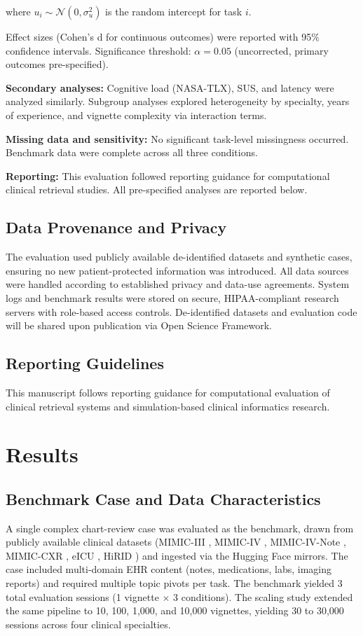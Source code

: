 \documentclass[preprint,12pt]{elsarticle}
\begin{document}
where $u_i \sim \mathcal{N}(0, \sigma_u^2)$ is the random intercept for task $i$.

Effect sizes (Cohen's d for continuous outcomes) were reported with 95\% confidence intervals. Significance threshold: $\alpha = 0.05$ (uncorrected, primary outcomes pre-specified).

\textbf{Secondary analyses:} Cognitive load (NASA-TLX), SUS, and latency were analyzed similarly. Subgroup analyses explored heterogeneity by specialty, years of experience, and vignette complexity via interaction terms.

\textbf{Missing data and sensitivity:} No significant task-level missingness occurred. Benchmark data were complete across all three conditions.

\textbf{Reporting:} This evaluation followed reporting guidance for computational clinical retrieval studies. All pre-specified analyses are reported below.

\subsection{Data Provenance and Privacy}
The evaluation used publicly available de-identified datasets and synthetic cases, ensuring no new patient-protected information was introduced. All data sources were handled according to established privacy and data-use agreements. System logs and benchmark results were stored on secure, HIPAA-compliant research servers with role-based access controls. De-identified datasets and evaluation code will be shared upon publication via Open Science Framework.

\subsection{Reporting Guidelines}
This manuscript follows reporting guidance for computational evaluation of clinical retrieval systems and simulation-based clinical informatics research.

\section{Results}

\subsection{Benchmark Case and Data Characteristics}
A single complex chart-review case was evaluated as the benchmark, drawn from publicly available clinical datasets (MIMIC-III \citep{johnson2016_mimic3}, MIMIC-IV \citep{pollard2018_mimic4}, MIMIC-IV-Note \citep{johnson2023_mimiciv_note}, MIMIC-CXR \citep{johnson2019_mimic_cxr}, eICU \citep{pollard2018_eicu}, HiRID \citep{muller2021_hirid}) and ingested via the Hugging Face mirrors. The case included multi-domain EHR content (notes, medications, labs, imaging reports) and required multiple topic pivots per task. The benchmark yielded 3 total evaluation sessions (1 vignette $\times$ 3 conditions). The scaling study extended the same pipeline to 10, 100, 1{,}000, and 10{,}000 vignettes, yielding 30 to 30{,}000 sessions across four clinical specialties.
\end{document}
